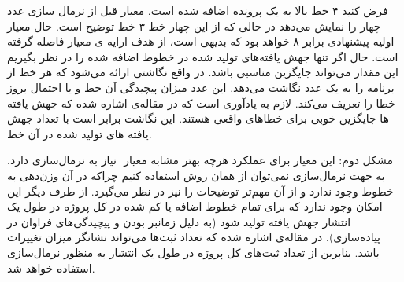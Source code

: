فرض کنید ۴ خط بالا به یک پرونده اضافه شده است. معیار   قبل از نرمال سازی عدد چهار را نمایش می‌دهد در حالی که از این چهار خط ۳ خط توضیح است. حال معیار اولیه پیشنهادی برابر ۸ خواهد بود که بدیهی است، از هدف ارايه ی معیار فاصله گرفته است. حال اگر تنها جهش یافته‌های تولید شده در خطوط اضافه شده را در نظر بگیریم این مقدار می‌تواند جایگزین مناسبی باشد. در‌ واقع نگاشتی  ارائه می‌شود که هر خط از برنامه را به یک عدد نگاشت می‌دهد. این عدد میزان پیچیدگی آن خط و یا احتمال بروز خطا را تعریف می‌کند.  لازم به یادآوری است که در مقاله‌ی  \cite{just2014mutants} اشاره شده که جهش یافته ها جایگزین خوبی برای خطاهای واقعی هستند. این نگاشت برابر است با تعداد جهش یافته های تولید شده در آن خط.

مشکل دوم: این معیار برای عملکرد هرچه بهتر مشابه معیار  ‌ نیاز به نرمال‌سازی دارد. به جهت نرمال‌سازی نمی‌توان از همان روش استفاده کنیم چراکه در آن وزن‌دهی به خطوط وجود ندارد و از آن مهم‌تر توضیحات را نیز در نظر می‌گیرد. از طرف دیگر این امکان وجود ندارد که برای تمام خطوط اضافه یا کم شده در کل پروژه در طول یک انتشار جهش یافته تولید شود (به دلیل زمانبر بودن و پیچیدگی‌های فراوان در پیاده‌سازی). در مقاله‌ی \cite{bird2011don} اشاره شده که تعداد ثبت‌ها می‌تواند نشانگر میزان تغییرات باشد. بنابرین از تعداد ثبت‌های کل پروژه در طول یک انتشار به منظور نرمال‌سازی استفاده خواهد شد.





